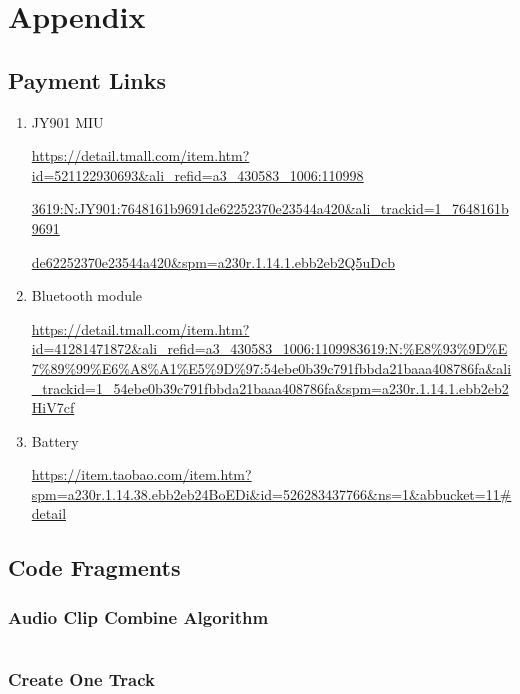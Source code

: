 \section{Appendix}

\subsection{Payment Links}

\begin{enumerate}
\item JY901 MIU

\url{https://detail.tmall.com/item.htm?id=521122930693&ali_refid=a3_430583_1006:110998}

\url{3619:N:JY901:7648161b9691de62252370e23544a420&ali_trackid=1_7648161b9691}

\url{ de62252370e23544a420&spm=a230r.1.14.1.ebb2eb2Q5uDcb} 

\item  Bluetooth module 

\url{https://detail.tmall.com/item.htm?id=41281471872&ali_refid=a3_430583_1006:1109983619:N:%E8%93%9D%E7%89%99%E6%A8%A1%E5%9D%97:54ebe0b39c791fbbda21baaa408786fa&ali_trackid=1_54ebe0b39c791fbbda21baaa408786fa&spm=a230r.1.14.1.ebb2eb2HiV7cf}
\item  Battery 

\url{https://item.taobao.com/item.htm?spm=a230r.1.14.38.ebb2eb24BoEDi&id=526283437766&ns=1&abbucket=11#detail} 

\end{enumerate}


\subsection{Code Fragments}


\subsubsection{Audio Clip Combine Algorithm}
\inputminted[fontsize=\small,tabsize=4]{csharp}{scr/ACCombine.cs}

\newpage

\subsubsection{Create One Track}
\inputminted[fontsize=\small,tabsize=4]{csharp}{scr/CreateOneTrack.cs}
\newpage
\inputminted[fontsize=\small,tabsize=4]{csharp}{scr/cot2.cs}


